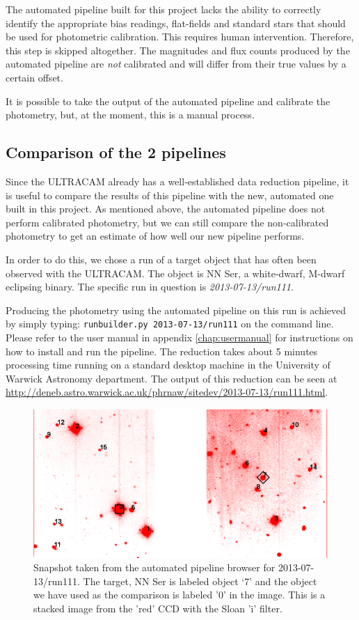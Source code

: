 The automated pipeline built for this project lacks the ability to correctly identify the appropriate bias readings, flat-fields and standard stars that should be used for photometric calibration. This requires human intervention. Therefore, this step is skipped altogether. The magnitudes and flux counts produced by the automated pipeline are \emph{not} calibrated and will differ from their true values by a certain offset.

It is possible to take the output of the automated pipeline and calibrate the photometry, but, at the moment, this is a manual process. 

\subsection{Comparison of the 2 pipelines}
Since the ULTRACAM already has a well-established data reduction pipeline, it is useful to compare the results of this pipeline with the new, automated one built in this project. As mentioned above, the automated pipeline does not perform calibrated photometry, but we can still compare the non-calibrated photometry to get an estimate of how well our new pipeline performs.

In order to do this, we chose a run of a target object that has often been observed with the ULTRACAM. The object is NN Ser, a white-dwarf, M-dwarf eclipsing binary. The specific run in question is \emph{2013-07-13/run111}.

Producing the photometry using the automated pipeline on this run is achieved by simply typing: \texttt{runbuilder.py 2013-07-13/run111} on the command line. Please refer to the user manual in appendix \ref{chap:usermanual} for instructions on how to install and run the pipeline.  The reduction takes about 5 minutes processing time running on a standard desktop machine in the University of Warwick Astronomy department. The output of this reduction can be seen at \url{http://deneb.astro.warwick.ac.uk/phrnaw/sitedev/2013-07-13/run111.html}.

\begin{figure}
\centering
\includegraphics[width=120mm]{images/2013-07-13-run111-r-withlabels.png}
\caption{Snapshot taken from the automated pipeline browser for 2013-07-13/run111. The target, {NN Ser} is labeled object `7' and the object we have used as the comparison is labeled '0' in the image. This is a stacked image from the 'red' CCD with the Sloan 'i' filter. }
\label{fig:nnserfield}
\end{figure}

